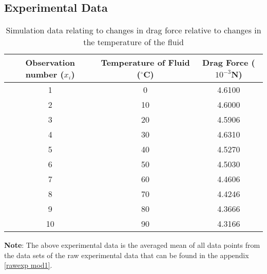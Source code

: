

\subsection{{Experimental Data}}

	\begin{table}[H]
		\centering
		\begin{tabular}{|c|c|c|}
			\hline
			\hline
			{Observation number ($x_i$)} & {Temperature of Fluid ($^\circ$C)} & {Drag Force ($10^{-3}$N)} \\
			\hline
			\hline
			1 & 0 & 4.6100 \\
			\hline
			2 & 10 & 4.6000 \\
			\hline
			3 & 20 & 4.5906 \\
			\hline
			4 & 30 & 4.6310 \\
			\hline
			5 & 40 & 4.5270 \\
			\hline
			6 & 50 & 4.5030 \\
			\hline
			7 & 60 & 4.4606 \\
			\hline
			8 & 70 & 4.4246 \\
			\hline
			9 & 80 & 4.3666 \\
			\hline
			10 & 90 & 4.3166 \\
			\hline
			\hline
		\end{tabular}
		\caption{{Simulation data relating to changes in drag force relative to changes in the temperature of the fluid}}
		\label{expdat}
	\end{table}

	{\textbf{Note}: The above experimental data is the averaged mean of all data points from the data sets of the raw experimental data that can be found in the appendix \ref{rawexp mod1}.}


